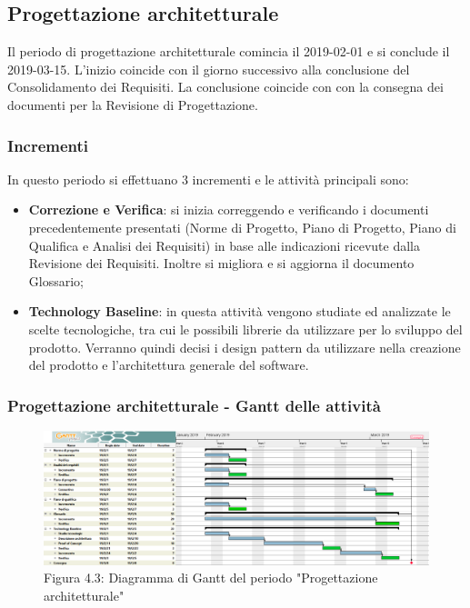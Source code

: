 \subsection{Progettazione architetturale}
Il periodo di progettazione architetturale comincia il 2019-02-01 e si conclude il 2019-03-15. L'inizio coincide con il giorno successivo alla conclusione del Consolidamento dei Requisiti. La conclusione coincide con con la consegna dei documenti per la Revisione di Progettazione. 
\subsubsection{Incrementi}
In questo periodo si effettuano 3 incrementi e le attività principali sono:
\begin{itemize}
	\item \textbf{Correzione e Verifica}: si inizia correggendo e verificando i documenti precedentemente presentati (Norme di Progetto, Piano di Progetto, Piano di Qualifica e Analisi dei Requisiti) in base alle indicazioni ricevute dalla Revisione dei Requisiti. Inoltre si migliora e si aggiorna il documento Glossario;
	\item \textbf{Technology Baseline}: in questa attività vengono studiate ed analizzate le scelte tecnologiche, tra cui le possibili librerie da utilizzare per lo sviluppo del prodotto. Verranno quindi decisi i design pattern da utilizzare nella creazione del prodotto e l'architettura generale del software.
\end{itemize}

\subsubsection{Progettazione architetturale - Gantt delle attività}

\begin{figure} [H]
	\centering
	\includegraphics[scale=0.3]{Res/Gantt/Progettazione}
	\caption{Figura 4.3: Diagramma di Gantt del periodo "Progettazione architetturale"}\label{}
\end{figure}

\pagebreak
